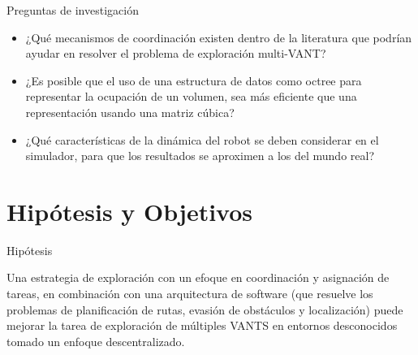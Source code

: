 \documentclass[
  24pt, %
  aspectratio=169, %
]{beamer}
\begin{document}
\begin{frame}{Preguntas de investigación}
  
  \begin{itemize}

  \item ¿Qué mecanismos de coordinación existen dentro de la literatura que podrían ayudar en resolver el problema de exploración multi-VANT?
  \item ¿Es posible que el uso de una estructura de datos como octree para representar la ocupación de un volumen, sea más eficiente que una representación usando una matriz cúbica?
  \item ¿Qué características de la dinámica del robot se deben considerar en el simulador, para que los resultados se aproximen a los del mundo real?
    
  \end{itemize}
\end{frame}

\section{Hipótesis y Objetivos}

\begin{frame}{Hipótesis}

  Una estrategia de exploración con un efoque en coordinación y asignación de tareas, en combinación con una arquitectura de software (que resuelve los problemas de planificación de rutas, evasión de obstáculos y localización) puede mejorar la tarea de exploración de múltiples VANTS en entornos desconocidos tomado un enfoque descentralizado.
  
  
  
\end{frame}
\end{document}
